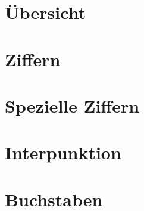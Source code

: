 \documentclass[a4paper,landscape]{article}
\begin{document}
\section{Übersicht}
\newlength\digitwidth
\digitwidth=2.5cm
\showglyph{,}
\showglyph{-}
\showglyph{/}
\showglyph{:}
\newpage
\digitwidth=1.75cm

\section{Ziffern}

\section{Spezielle Ziffern}

\section{Interpunktion}
\showtransition{:}{:}

\section{Buchstaben}
\end{document}
